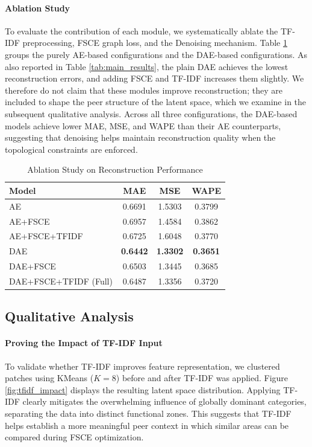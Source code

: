 \documentclass[sigconf]{acmart}
\begin{document}
\paragraph{Ablation Study}

To evaluate the contribution of each module, we systematically ablate the TF-IDF preprocessing, FSCE graph loss, and the Denoising mechanism. Table \ref{tab:ablation_results} groups the purely AE-based configurations and the DAE-based configurations. As also reported in Table \ref{tab:main_results}, the plain DAE achieves the lowest reconstruction errors, and adding FSCE and TF-IDF increases them slightly. We therefore do not claim that these modules improve reconstruction; they are included to shape the peer structure of the latent space, which we examine in the subsequent qualitative analysis. Across all three configurations, the DAE-based models achieve lower MAE, MSE, and WAPE than their AE counterparts, suggesting that denoising helps maintain reconstruction quality when the topological constraints are enforced.

\begin{table}[h]
\centering
\caption{Ablation Study on Reconstruction Performance}
\label{tab:ablation_results}
\begin{tabular}{p{4.5cm}ccc}
\toprule
Model & MAE & MSE & WAPE \\
\midrule
AE & 0.6691 & 1.5303 & 0.3799 \\
AE+FSCE & 0.6957 & 1.4584 & 0.3862 \\
AE+FSCE+TFIDF & 0.6725 & 1.6048 & 0.3770 \\
\midrule
DAE & \textbf{0.6442} & \textbf{1.3302} & \textbf{0.3651} \\
DAE+FSCE & 0.6503 & 1.3445 & 0.3685 \\
DAE+FSCE+TFIDF (Full) & 0.6487 & 1.3356 & 0.3720 \\
\bottomrule
\end{tabular}
\end{table}

\subsection{Qualitative Analysis}
\label{sec:qualitative}


\paragraph{Proving the Impact of TF-IDF Input}
To validate whether TF-IDF improves feature representation, we clustered patches using KMeans ($K=8$) before and after TF-IDF was applied. Figure \ref{fig:tfidf_impact} displays the resulting latent space distribution. Applying TF-IDF clearly mitigates the overwhelming influence of globally dominant categories, separating the data into distinct functional zones. This suggests that TF-IDF helps establish a more meaningful peer context in which similar areas can be compared during FSCE optimization.
\end{document}
